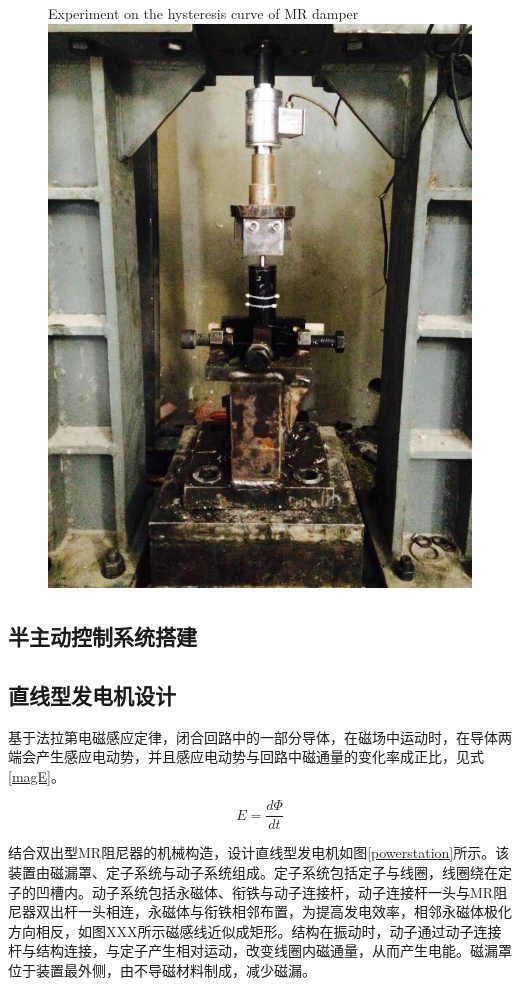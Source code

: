 \begin{figure}[H]
	\centering
		{Experiment on the hysteresis curve of MR damper}
	\label{shiyan}
	\includegraphics[width=.5\linewidth]{figure/shiyan}
\end{figure}








\subsection{半主动控制系统搭建}






\subsection{直线型发电机设计}
基于法拉第电磁感应定律，闭合回路中的一部分导体，在磁场中运动时，在导体两端会产生感应电动势，并且感应电动势与回路中磁通量的变化率成正比\cite{elliott1993}，见式\eqref{magE}。

\begin{equation}
\label{magE}
E=\frac{d\Phi}{dt}
\end{equation}

结合双出型MR阻尼器的机械构造，设计直线型发电机如图\ref{powerstation}所示。该装置由磁漏罩、定子系统与动子系统组成。定子系统包括定子与线圈，线圈绕在定子的凹槽内。动子系统包括永磁体、衔铁与动子连接杆，动子连接杆一头与MR阻尼器双出杆一头相连，永磁体与衔铁相邻布置，为提高发电效率，相邻永磁体极化方向相反，如图XXX所示磁感线近似成矩形。结构在振动时，动子通过动子连接杆与结构连接，与定子产生相对运动，改变线圈内磁通量，从而产生电能。磁漏罩位于装置最外侧，由不导磁材料制成，减少磁漏。


